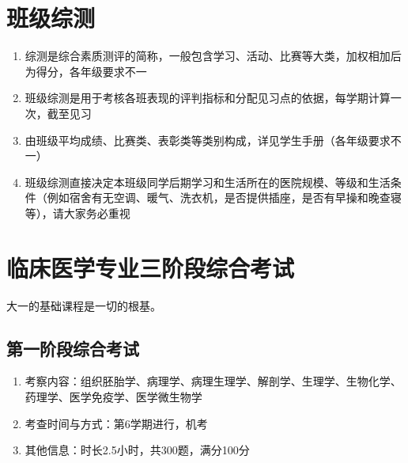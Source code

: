 \section[班级综测]{班级综测}
\label{class_evaluation}
\begin{enumerate}
    \item 综测是综合素质测评的简称，一般包含学习、活动、比赛等大类，加权相加后为得分，各年级要求不一
    \item 班级综测是用于考核各班表现的评判指标和分配见习点的依据\footnotemark，每学期计算一次，截至见习
    \item 由班级平均成绩、比赛类、表彰类等类别构成，详见学生手册（各年级要求不一）
    \item 班级综测直接决定本班级同学后期学习和生活所在的医院规模、等级和生活条件（例如宿舍有无空调、暖气、洗衣机，是否提供插座，是否有早操和晚查寝\footnotemark 等），请大家务必重视
\end{enumerate}

\section[临床医学专业三阶段综合考试]{临床医学专业三阶段综合考试}
大一的基础课程是一切的根基。

\subsection[第一阶段综合考试]{第一阶段综合考试}
\begin{enumerate}
    \item 考察内容：组织胚胎学、病理学、病理生理学、解剖学、生理学、生物化学、药理学、医学免疫学、医学微生物学
    \item 考查时间与方式：第6学期进行，机考
    \item 其他信息：时长2.5小时，共300题，满分100分
\end{enumerate}

